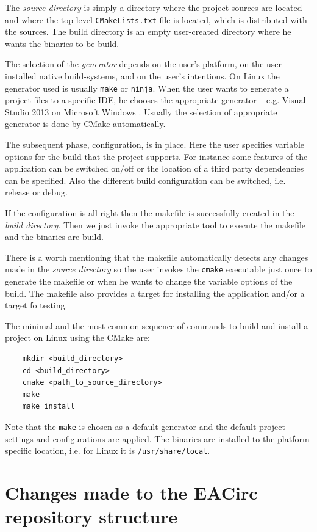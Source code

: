 \documentclass[12pt,oneside]{fithesis2}
\begin{document}
The \emph{source directory} is simply a directory where the project sources are located and where the top-level \texttt{CMakeLists.txt} file is located, which is distributed with the sources. The build directory is an empty user-created directory where he wants the binaries to be build.

The selection of the \emph{generator} depends on the user's platform, on the user-installed native build-systems, and on the user's intentions. On Linux the generator used is usually \texttt{make} or \texttt{ninja}. When the user wants to generate a project files to a specific IDE, he chooses the appropriate generator -- e.g. Visual Studio 2013 \cite{msvc} on Microsoft Windows \cite{win}. Usually the selection of appropriate generator is done by CMake automatically.

The subsequent phase, configuration, is in place. Here the user specifies variable options for the build that the project supports. For instance some features of the application can be switched on/off or the location of a third party dependencies can be specified. Also the different build configuration can be switched, i.e. release or debug.

If the configuration is all right then the makefile is successfully created in the \emph{build directory}. Then we just invoke the appropriate tool to execute the makefile and the binaries are build.

There is a worth mentioning that the makefile automatically detects any changes made in the \emph{source directory} so the user invokes the \texttt{cmake} executable just once to generate the makefile or when he wants to change the variable options of the build. The makefile also provides a target for installing the application and/or a target fo testing.

The minimal and the most common sequence of commands to build and install a project on Linux using the CMake are:
	\begin{verbatim}
	mkdir <build_directory>
	cd <build_directory>
	cmake <path_to_source_directory>
	make
	make install
	\end{verbatim}
Note that the \texttt{make} is chosen as a default generator and the default project settings and configurations are applied. The binaries are installed to the platform specific location, i.e. for Linux it is \texttt{/usr/share/local}.

\section{Changes made to the EACirc repository structure}
\end{document}
